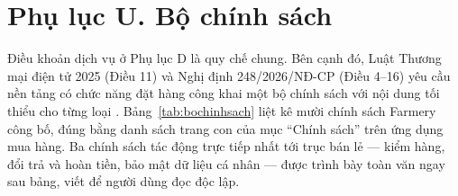 
\section*{Phụ lục U. Bộ chính sách}
\label{apdx:chinhsach}

Điều khoản dịch vụ ở Phụ lục D là quy chế chung. Bên cạnh đó, Luật Thương mại
điện tử 2025 (Điều 11) và Nghị định 248/2026/NĐ-CP (Điều 4--16) yêu cầu nền
tảng có chức năng đặt hàng công khai một bộ chính sách với nội dung tối thiểu
cho từng loại \parencite{luattmdt2025, nd248_2026}. Bảng~\ref{tab:bochinhsach}
liệt kê mười chính sách Farmery công bố, đúng bằng danh sách trang con của mục
``Chính sách'' trên ứng dụng mua hàng. Ba chính sách tác động trực tiếp nhất
tới trục bán lẻ --- kiểm hàng, đổi trả và hoàn tiền, bảo mật dữ liệu cá nhân
--- được trình bày toàn văn ngay sau bảng, viết để người dùng đọc độc lập.


